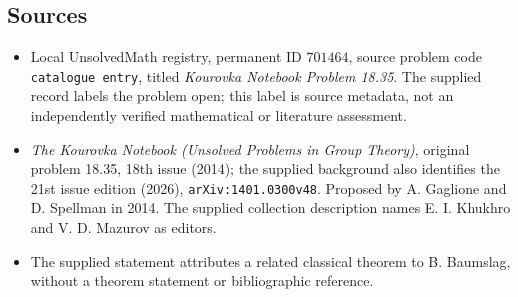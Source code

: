 \documentclass[11pt]{article}
\begin{document}
\subsection{Sources}
\begin{itemize}
\item Local UnsolvedMath registry, permanent ID \(701464\), source problem code \texttt{catalogue entry}, titled \emph{Kourovka Notebook Problem 18.35}. The supplied record labels the problem open; this label is source metadata, not an independently verified mathematical or literature assessment.
\item \emph{The Kourovka Notebook (Unsolved Problems in Group Theory)}, original problem 18.35, 18th issue (2014); the supplied background also identifies the 21st issue edition (2026), \texttt{arXiv:1401.0300v48}. Proposed by A. Gaglione and D. Spellman in 2014. The supplied collection description names E. I. Khukhro and V. D. Mazurov as editors.
\item The supplied statement attributes a related classical theorem to B. Baumslag, without a theorem statement or bibliographic reference.
\end{itemize}
\end{document}
